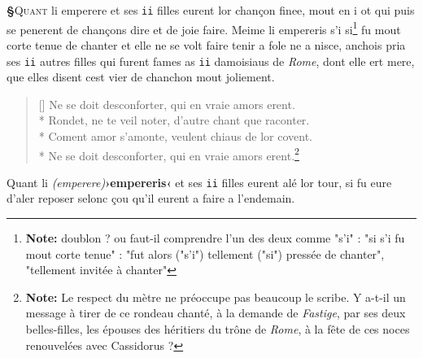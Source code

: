 \documentclass[12pt]{article} %
\newcommand{\persName}[1]{\emph{#1}} %
\newcommand{\placeName}[1]{\emph{#1}} %
\newcommand{\num}[1]{\texttt{#1}}    %
\newcommand{\corr}[2]{\emph{(#1)}\textbf{›#2‹}} %
\newcommand{\supplied}[1]{\textlangle#1\textrangle} %
\newcommand{\fnnote}[1]{\footnote{\textbf{Note:} #1}} %
\newcounter{paranum}
\newcommand{\pnum}{\stepcounter{paranum}\textbf{§\arabic{paranum}}\quad}
\begin{document}
\pnum \lettrine[lines=2]{\color{darkblue}Q}{uant} li emperere et ses \num{ii} filles eurent lor chançon finee, mout en i ot qui puis se penerent de chançons dire et de joie faire. Meime li empereris s'i si\fnnote{doublon ? ou faut-il comprendre l'un des deux comme "s'i" : "si s'i fu mout corte tenue" : "fut alors ("s'i") tellement ("si") pressée de chanter", "tellement invitée à chanter"} fu mout corte tenue de chanter et elle ne se volt faire tenir a fole ne a nisce, anchois pria ses \num{ii} autres filles qui fure\supplied{n}t fames as \num{ii} damoisiaus de \placeName{Rome}, dont elle ert mere, que elles disent cest vier de chanchon mout joliement. 
\begin{verse}[\versewidth]
Ne se doit desconforter, qui en vraie amors erent. \\*
Rondet, ne te veil noter, d'autre chant que raconter. \\*
Coment amor s'amonte, veulent chiaus de lor covent. \\*
Ne se doit desconforter, qui en vraie amors erent.\fnnote{Le respect du mètre ne préoccupe pas beaucoup le scribe. Y a-t-il un message à tirer de ce rondeau chanté, à la demande de \persName{Fastige}, par ses deux belles-filles, les épouses des héritiers du trône de \placeName{Rome}, à la fête de ces noces renouvelées avec Cassidorus ?}
\end{verse}
Quant li \corr{emperere}{empereris} et ses \num{ii} filles eurent alé lor tour, si fu eure d'aler reposer selonc çou qu'il eurent a faire a l'endemain.
\end{document}

